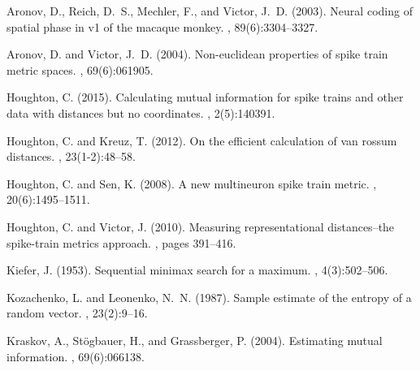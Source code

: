 \documentclass[12pt]{article}
\begin{document}
\begin{thebibliography}{}

Aronov, D., Reich, D.~S., Mechler, F., and Victor, J.~D. (2003).
\newblock Neural coding of spatial phase in v1 of the macaque monkey.
, 89(6):3304--3327.

Aronov, D. and Victor, J.~D. (2004).
\newblock Non-euclidean properties of spike train metric spaces.
, 69(6):061905.

Houghton, C. (2015).
\newblock Calculating mutual information for spike trains and other data with
  distances but no coordinates.
, 2(5):140391.

Houghton, C. and Kreuz, T. (2012).
\newblock On the efficient calculation of van rossum distances.
, 23(1-2):48--58.

Houghton, C. and Sen, K. (2008).
\newblock A new multineuron spike train metric.
, 20(6):1495--1511.

Houghton, C. and Victor, J. (2010).
\newblock Measuring representational distances--the spike-train metrics
  approach.
, pages 391--416.

Kiefer, J. (1953).
\newblock Sequential minimax search for a maximum.
,
  4(3):502--506.

Kozachenko, L. and Leonenko, N.~N. (1987).
\newblock Sample estimate of the entropy of a random vector.
, 23(2):9--16.

Kraskov, A., St{\"o}gbauer, H., and Grassberger, P. (2004).
\newblock Estimating mutual information.
, 69(6):066138.


\end{thebibliography}
\end{document}
